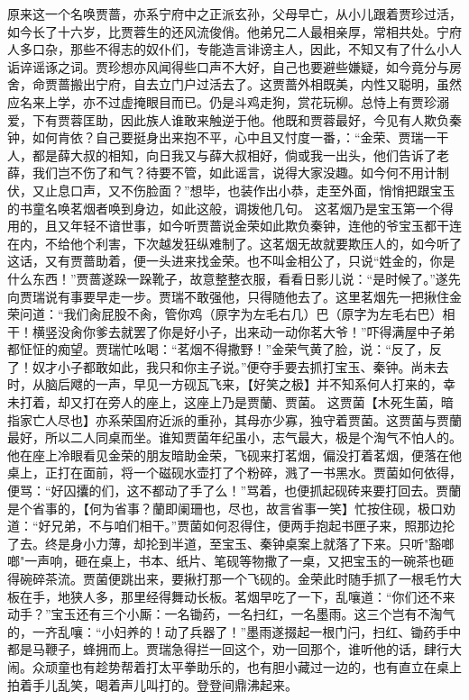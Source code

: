 \documentclass[12pt,oneside]{book}
\begin{document}
原来这一个名唤贾蔷，亦系宁府中之正派玄孙，父母早亡，从小儿跟着贾珍过活，如今长了十六岁，比贾蓉生的还风流俊俏。他弟兄二人最相亲厚，常相共处。宁府人多口杂，那些不得志的奴仆们，专能造言诽谤主人，因此，不知又有了什么小人诟谇谣诼之词。贾珍想亦风闻得些口声不大好，自己也要避些嫌疑，如今竟分与房舍，命贾蔷搬出宁府，自去立门户过活去了。这贾蔷外相既美，内性又聪明，虽然应名来上学，亦不过虚掩眼目而已。仍是斗鸡走狗，赏花玩柳。总恃上有贾珍溺爱，下有贾蓉匡助，因此族人谁敢来触逆于他。他既和贾蓉最好，今见有人欺负秦钟，如何肯依？自己要挺身出来抱不平，心中且又忖度一番，：“金荣、贾瑞一干人，都是薛大叔的相知，向日我又与薛大叔相好，倘或我一出头，他们告诉了老薛，我们岂不伤了和气？待要不管，如此谣言，说得大家没趣。如今何不用计制伏，又止息口声，又不伤脸面？”想毕，也装作出小恭，走至外面，悄悄把跟宝玉的书童名唤茗烟者唤到身边，如此这般，调拨他几句。
这茗烟乃是宝玉第一个得用的，且又年轻不谙世事，如今听贾蔷说金荣如此欺负秦钟，连他的爷宝玉都干连在内，不给他个利害，下次越发狂纵难制了。这茗烟无故就要欺压人的，如今听了这话，又有贾蔷助着，便一头进来找金荣。也不叫金相公了，只说“姓金的，你是什么东西！”贾蔷遂跺一跺靴子，故意整整衣服，看看日影儿说：“是时候了。”遂先向贾瑞说有事要早走一步。贾瑞不敢强他，只得随他去了。这里茗烟先一把揪住金荣问道：“我们肏屁股不肏，管你鸡（原字为左毛右几）巴（原字为左毛右巴）相干！横竖没肏你爹去就罢了你是好小子，出来动一动你茗大爷！”吓得满屋中子弟都怔怔的痴望。贾瑞忙吆喝：“茗烟不得撒野！”金荣气黄了脸，说：“反了，反了！奴才小子都敢如此，我只和你主子说。”便夺手要去抓打宝玉、秦钟。尚未去时，从脑后飕的一声，早见一方砚瓦飞来，【好笑之极】并不知系何人打来的，幸未打着，却又打在旁人的座上，这座上乃是贾蘭、贾菌。
这贾菌【木死生菌，暗指家亡人尽也】亦系荣国府近派的重孙，其母亦少寡，独守着贾菌。这贾菌与贾蘭最好，所以二人同桌而坐。谁知贾菌年纪虽小，志气最大，极是个淘气不怕人的。他在座上冷眼看见金荣的朋友暗助金荣，飞砚来打茗烟，偏没打着茗烟，便落在他桌上，正打在面前，将一个磁砚水壶打了个粉碎，溅了一书黑水。贾菌如何依得，便骂：“好囚攮的们，这不都动了手了么！”骂着，也便抓起砚砖来要打回去。贾蘭是个省事的，【何为省事？蘭即阑珊也，尽也，故言省事一笑】忙按住砚，极口劝道：“好兄弟，不与咱们相干。”贾菌如何忍得住，便两手抱起书匣子来，照那边抡了去。终是身小力薄，却抡到半道，至宝玉、秦钟桌案上就落了下来。只听"豁啷啷"一声响，砸在桌上，书本、纸片、笔砚等物撒了一桌，又把宝玉的一碗茶也砸得碗碎茶流。贾菌便跳出来，要揪打那一个飞砚的。金荣此时随手抓了一根毛竹大板在手，地狭人多，那里经得舞动长板。茗烟早吃了一下，乱嚷道：“你们还不来动手？”宝玉还有三个小厮：一名锄药，一名扫红，一名墨雨。这三个岂有不淘气的，一齐乱嚷：“小妇养的！动了兵器了！”墨雨遂掇起一根门闩，扫红、锄药手中都是马鞭子，蜂拥而上。贾瑞急得拦一回这个，劝一回那个，谁听他的话，肆行大闹。众顽童也有趁势帮着打太平拳助乐的，也有胆小藏过一边的，也有直立在桌上拍着手儿乱笑，喝着声儿叫打的。登登间鼎沸起来。
\end{document}
